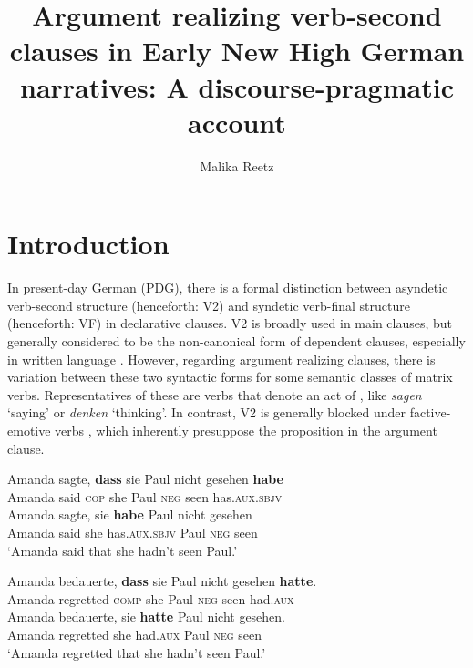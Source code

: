 \documentclass[output=paper,colorlinks,citecolor=brown]{langscibook}
\author{Malika Reetz\orcid{0009-0004-7923-0606}\affiliation{Universität Potsdam}}
\title[Argument realizing V2-clauses in Early New High German narratives]{Argument realizing verb-second clauses in Early New High German narratives: A discourse-pragmatic account}
\begin{document}
 
\maketitle

\section{Introduction}\label{sec:reetz:1}
In present-day German (PDG), there is a formal distinction between asyndetic verb-second structure (henceforth: V2) and syndetic verb-final structure (henceforth: VF) in declarative clauses. V2 is broadly used in main clauses, but generally considered to be the non-canonical form of dependent clauses, especially in written language \citep{Auer1998, Axel2012}. However, regarding argument realizing clauses, there is variation between these two syntactic forms for some semantic classes of matrix verbs. Representatives of these are verbs that denote an act of  , like \textit{sagen} ‘saying' or \textit{denken} ‘thinking'. In contrast, V2 is generally blocked under factive-emotive verbs , which inherently presuppose the proposition in the argument clause.


\ea\label{ex:reetz:1}
\ea \label{ex:reetz:1a}
\gll Amanda sagte, \textbf{dass} sie Paul nicht gesehen \textbf{habe}\\
     Amanda said \textsc{cop} she Paul \textsc{neg} seen has.\textsc{aux}.\textsc{sbjv}\\
\ex \label{ex:reetz:1b}
\gll Amanda sagte, sie \textbf{habe} Paul nicht gesehen\\
     Amanda said she has.\textsc{aux}.\textsc{sbjv} Paul \textsc{neg} seen\\
\glt `Amanda said that she hadn't seen Paul.'
\z
\z

\ea \label{ex:reetz:2}
\ea \label{ex:key:2.1}
\gll Amanda bedauerte, \textbf{dass} sie Paul nicht gesehen \textbf{hatte}.\\
     Amanda regretted \textsc{comp} she Paul \textsc{neg} seen had.\textsc{aux}\\
\ex \label{ex:key:2.2}
\gll *Amanda bedauerte, sie \textbf{hatte} Paul nicht gesehen.\\
     Amanda regretted she had.\textsc{aux} Paul \textsc{neg} seen\\
\glt `Amanda regretted that she hadn't seen Paul.'
\z
\z
\end{document}
